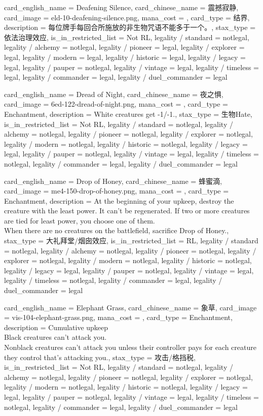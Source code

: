 \documentclass[lang = cn, color = black, 10pt]{AllThatStax}
\begin{document}
\card
{
	card_english_name = {Deafening Silence},
	card_chinese_name = {震撼寂静},
	card_image = eld-10-deafening-silence.png,
	mana_cost = ,
	card_type = 结界,
	description = {每位牌手每回合所施放的非生物咒语不能多于一个。},
	stax_type = 依法治理效应,
	is_in_restricted_list = Not RL,
	legality / standard = notlegal,
	legality / alchemy = notlegal,
	legality / pioneer = legal,
	legality / explorer = legal,
	legality / modern = legal,
	legality / historic = legal,
	legality / legacy = legal,
	legality / pauper = notlegal,
	legality / vintage = legal,
	legality / timeless = legal,
	legality / commander = legal,
	legality / duel_commander = legal
}

\card
{
	card_english_name = {Dread of Night},
	card_chinese_name = {夜之惧},
	card_image = 6ed-122-dread-of-night.png,
	mana_cost = ,
	card_type = Enchantment,
	description = {White creatures get -1/-1.},
	stax_type = 生物Hate,
	is_in_restricted_list = Not RL,
	legality / standard = notlegal,
	legality / alchemy = notlegal,
	legality / pioneer = notlegal,
	legality / explorer = notlegal,
	legality / modern = notlegal,
	legality / historic = notlegal,
	legality / legacy = legal,
	legality / pauper = notlegal,
	legality / vintage = legal,
	legality / timeless = notlegal,
	legality / commander = legal,
	legality / duel_commander = legal
}

\card
{
	card_english_name = {Drop of Honey},
	card_chinese_name = {蜂蜜滴},
	card_image = me4-150-drop-of-honey.png,
	mana_cost = ,
	card_type = Enchantment,
	description = {At the beginning of your upkeep, destroy the creature with the least power. It can't be regenerated. If two or more creatures are tied for least power, you choose one of them.\\
		When there are no creatures on the battlefield, sacrifice Drop of Honey.},
	stax_type = 大礼拜堂/烟囱效应,
	is_in_restricted_list = RL,
	legality / standard = notlegal,
	legality / alchemy = notlegal,
	legality / pioneer = notlegal,
	legality / explorer = notlegal,
	legality / modern = notlegal,
	legality / historic = notlegal,
	legality / legacy = legal,
	legality / pauper = notlegal,
	legality / vintage = legal,
	legality / timeless = notlegal,
	legality / commander = legal,
	legality / duel_commander = legal
}

\card
{
	card_english_name = {Elephant Grass},
	card_chinese_name = {象草},
	card_image = vis-104-elephant-grass.png,
	mana_cost = ,
	card_type = Enchantment,
	description = {Cumulative upkeep  \\
		Black creatures can't attack you.\\
		Nonblack creatures can't attack you unless their controller pays  for each creature they control that's attacking you.},
	stax_type = 攻击/格挡税,
	is_in_restricted_list = Not RL,
	legality / standard = notlegal,
	legality / alchemy = notlegal,
	legality / pioneer = notlegal,
	legality / explorer = notlegal,
	legality / modern = notlegal,
	legality / historic = notlegal,
	legality / legacy = legal,
	legality / pauper = notlegal,
	legality / vintage = legal,
	legality / timeless = notlegal,
	legality / commander = legal,
	legality / duel_commander = legal
}
\end{document}
